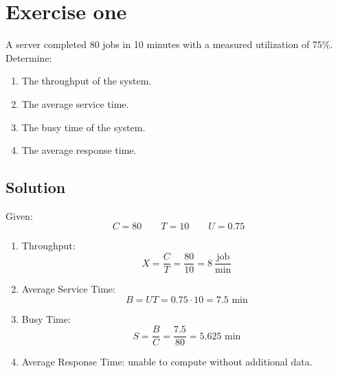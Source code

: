 \section{Exercise one}

A server completed 80 jobs in 10 minutes with a measured utilization of 75\%. 
Determine:
\begin{enumerate}
    \item The throughput of the system.
    \item The average service time.
    \item The busy time of the system.
    \item The average response time.
\end{enumerate}

\subsection*{Solution}
Given:
\[C=80 \qquad T=10\qquad U=0.75\]
\begin{enumerate}
    \item Throughput:
        \[X=\dfrac{C}{T}=\dfrac{80}{10}=8\:\dfrac{\text{job}}{\text{min}}\]
    \item Average Service Time:
        \[B=UT=0.75\cdot 10=7.5\text{ min}\]
    \item Busy Time:
        \[S=\dfrac{B}{C}=\dfrac{7.5}{80}=5.625\text{ min}\]
    \item Average Response Time: unable to compute without additional data.
\end{enumerate}
